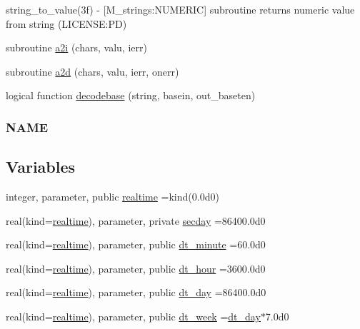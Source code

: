 \begin{DoxyCompactItemize}
\begin{DoxyCompactList}
string\+\_\+to\+\_\+value(3f) -\/ \mbox{[}M\+\_\+strings\+:N\+U\+M\+E\+R\+IC\mbox{]} subroutine returns numeric value from string (L\+I\+C\+E\+N\+SE\+:PD) \end{DoxyCompactList}\item 
subroutine \mbox{\hyperlink{namespacem__time_a200e48a4e0096b4343b0b72c95becd3d}{a2i}} (chars, valu, ierr)
\item 
subroutine \mbox{\hyperlink{namespacem__time_a9d508147e28034267073619ba8a0e910}{a2d}} (chars, valu, ierr, onerr)
\item 
logical function \mbox{\hyperlink{namespacem__time_a8dacab5686d74326cc68aa91b6f16c2d}{decodebase}} (string, basein, out\+\_\+baseten)
\begin{DoxyCompactList}\small\item\em \subsubsection*{N\+A\+ME}\end{DoxyCompactList}\end{DoxyCompactItemize}
\subsection*{Variables}
\begin{DoxyCompactItemize}
\item 
integer, parameter, public \mbox{\hyperlink{namespacem__time_ac10ea9e8d59ec74eaa7d89f2517d7422}{realtime}} =kind(0.\+0d0)
\item 
real(kind=\mbox{\hyperlink{namespacem__time_ac10ea9e8d59ec74eaa7d89f2517d7422}{realtime}}), parameter, private \mbox{\hyperlink{namespacem__time_a48130b5a95a3f2e776269dcee1426797}{secday}} =86400.\+0d0
\item 
real(kind=\mbox{\hyperlink{namespacem__time_ac10ea9e8d59ec74eaa7d89f2517d7422}{realtime}}), parameter, public \mbox{\hyperlink{namespacem__time_a9fe6fbb44e2779a2fcf96fba36c08918}{dt\+\_\+minute}} =60.\+0d0
\item 
real(kind=\mbox{\hyperlink{namespacem__time_ac10ea9e8d59ec74eaa7d89f2517d7422}{realtime}}), parameter, public \mbox{\hyperlink{namespacem__time_aa0ca2172092f5e7dcc9b8524e6516fd8}{dt\+\_\+hour}} =3600.\+0d0
\item 
real(kind=\mbox{\hyperlink{namespacem__time_ac10ea9e8d59ec74eaa7d89f2517d7422}{realtime}}), parameter, public \mbox{\hyperlink{namespacem__time_a97725f8d657c24badff19a794f323a6b}{dt\+\_\+day}} =86400.\+0d0
\item 
real(kind=\mbox{\hyperlink{namespacem__time_ac10ea9e8d59ec74eaa7d89f2517d7422}{realtime}}), parameter, public \mbox{\hyperlink{namespacem__time_a3d53519e90264faccdae67e389ffc003}{dt\+\_\+week}} =\mbox{\hyperlink{namespacem__time_a97725f8d657c24badff19a794f323a6b}{dt\+\_\+day}}$\ast$7.\+0d0
\end{DoxyCompactItemize}


